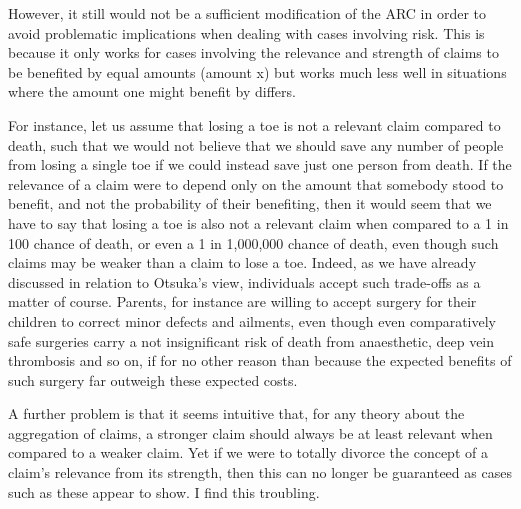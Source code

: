 \documentclass[man,11pt,a4paper]{apa7}
\begin{document}
However, it still would not be a sufficient modification of the ARC in order to avoid problematic implications when dealing with cases involving risk. This is because it only works for cases involving the relevance and strength of claims to be benefited by equal amounts (amount x) but works much less well in situations where the amount one might benefit by differs.

For instance, let us assume that losing a toe is not a relevant claim compared to death, such that we would not believe that we should save any number of people from losing a single toe if we could instead save just one person from death. If the relevance of a claim were to depend only on the amount that somebody stood to benefit, and not the probability of their benefiting, then it would seem that we have to say that losing a toe is also not a relevant claim when compared to a 1 in 100 chance of death, or even a 1 in 1,000,000 chance of death, even though such claims may be weaker than a claim to lose a toe. Indeed, as we have already discussed in relation to Otsuka's view, individuals accept such trade-offs as a matter of course. Parents, for instance are willing to accept surgery for their children to correct minor defects and ailments, even though even comparatively safe surgeries carry a not insignificant risk of death from anaesthetic, deep vein thrombosis and so on, if for no other reason than because the expected benefits of such surgery far outweigh these expected costs.

A further problem is that it seems intuitive that, for any theory about the aggregation of claims, a stronger claim should always be at least relevant when compared to a weaker claim. Yet if we were to totally divorce the concept of a claim's relevance from its strength, then this can no longer be guaranteed as cases such as these appear to show. I find this troubling.
\end{document}
